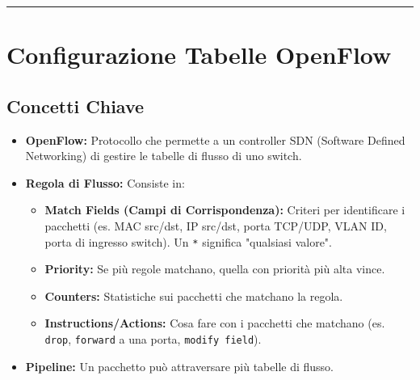 \hrule %

\section{Configurazione Tabelle OpenFlow}
\label{sec:openflow}

\subsection{Concetti Chiave}
\begin{itemize}
    \item \textbf{OpenFlow:} Protocollo che permette a un controller SDN (Software Defined Networking) di gestire le tabelle di flusso di uno switch.
    \item \textbf{Regola di Flusso:} Consiste in:
    \begin{itemize}
        \item \textbf{Match Fields (Campi di Corrispondenza):} Criteri per identificare i pacchetti (es. MAC src/dst, IP src/dst, porta TCP/UDP, VLAN ID, porta di ingresso switch). Un \texttt{*} significa "qualsiasi valore".
        \item \textbf{Priority:} Se più regole matchano, quella con priorità più alta vince.
        \item \textbf{Counters:} Statistiche sui pacchetti che matchano la regola.
        \item \textbf{Instructions/Actions:} Cosa fare con i pacchetti che matchano (es. \texttt{drop}, \texttt{forward} a una porta, \texttt{modify field}).
    \end{itemize}
    \item \textbf{Pipeline:} Un pacchetto può attraversare più tabelle di flusso.
\end{itemize}

